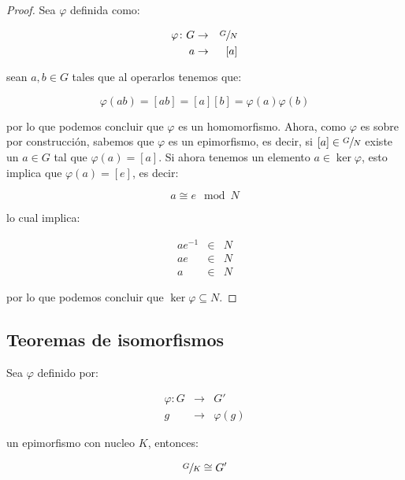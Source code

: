         \begin{proof}
            Sea $\varphi$ definida como:

            \begin{eqnarray*}
                \varphi \colon G & \to & \sfrac{G}{N} \\
                a & \to & [a]
            \end{eqnarray*}

            sean $a, b \in G$ tales que al operarlos tenemos que:

            \begin{equation*}
                \varphi(ab) = [ab] = [a][b] = \varphi(a)\varphi(b)
            \end{equation*}

            por lo que podemos concluir que $\varphi$ es un homomorfismo.
            Ahora, como $\varphi$ es sobre por construcción, sabemos que $\varphi$ es un epimorfismo, es decir, si $[a] \in \sfrac{G}{N}$ existe un $a \in G$ tal que $\varphi(a) = [a]$.
            Si ahora tenemos un elemento $a \in \ker{\varphi}$, esto implica que $\varphi(a) = [e]$, es decir:

            \begin{equation*}
                a \cong e \mod N
            \end{equation*}

            lo cual implica:

            \begin{eqnarray*}
                a e^{-1} & \in & N \\
                a e & \in & N \\
                a & \in & N
            \end{eqnarray*}

            por lo que podemos concluir que $\ker{\varphi} \subseteq N$.
        \end{proof}


    \subsection{Teoremas de isomorfismos}

        \begin{teorema}
            Sea $\varphi$ definido por:

            \begin{eqnarray*}
                \varphi \colon G & \to & G' \\
                g & \to & \varphi(g)
            \end{eqnarray*}

            un epimorfismo con nucleo $K$, entonces:

            \begin{equation}
                \sfrac{G}{K} \cong G'
            \end{equation}
        \end{teorema}

